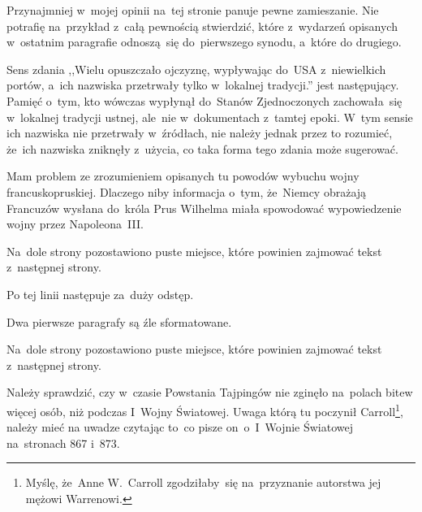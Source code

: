 \documentclass[a4paper,11pt]{article}
\begin{document}
\vspace{\spaceFour}


\start {} Przynajmniej w~mojej opinii na~tej stronie panuje
pewne zamieszanie. Nie potrafię na~przykład z~całą pewnością
stwierdzić, które z~wydarzeń opisanych w~ostatnim paragrafie
odnoszą~się do~pierwszego synodu, a~które do drugiego.

\vspace{\spaceFour}


\start {} Sens zdania ,,Wielu opuszczało ojczyznę,
wypływając do~USA z~niewielkich portów, a~ich nazwiska przetrwały
tylko w~lokalnej tradycji.'' jest następujący. Pamięć o~tym, kto
wówczas wypłynął do~Stanów Zjednoczonych zachowała~się w~lokalnej
tradycji ustnej, ale~nie w~dokumentach z~tamtej epoki. W~tym sensie
ich nazwiska nie przetrwały w~źródłach, nie należy jednak przez to
rozumieć, że~ich nazwiska zniknęły z~użycia, co taka forma tego zdania
może sugerować.

\vspace{\spaceFour}


\start {} Mam problem ze zrozumieniem opisanych tu powodów
wybuchu wojny francusko\dywiz pruskiej. Dlaczego niby informacja
o~tym, że~Niemcy obrażają Francuzów wysłana do~króla Prus Wilhelma
miała spowodować wypowiedzenie wojny przez Napoleona~III.

\vspace{\spaceFour}


\start {} Na~dole strony pozostawiono puste miejsce, które
powinien zajmować tekst z~następnej strony.

\vspace{\spaceFour}


\start {} Po tej linii następuje za~duży odstęp.

\vspace{\spaceFour}


\start {} Dwa pierwsze paragrafy są źle sformatowane.

\vspace{\spaceFour}


\start {} Na~dole strony pozostawiono puste miejsce, które
powinien zajmować tekst z~następnej strony.

\vspace{\spaceFour}


\start {} Należy sprawdzić, czy w~czasie Powstania Tajpingów
nie zginęło na~polach bitew więcej osób, niż podczas I~Wojny
Światowej. Uwaga którą tu poczynił Carroll\footnote{Myślę, że~Anne
  W.~Carroll zgodziłaby~się na~przyznanie autorstwa jej mężowi
  Warrenowi.}, należy mieć na uwadze czytając to~co pisze
on~o~I~Wojnie Światowej na~stronach 867 i~873.
\end{document}
